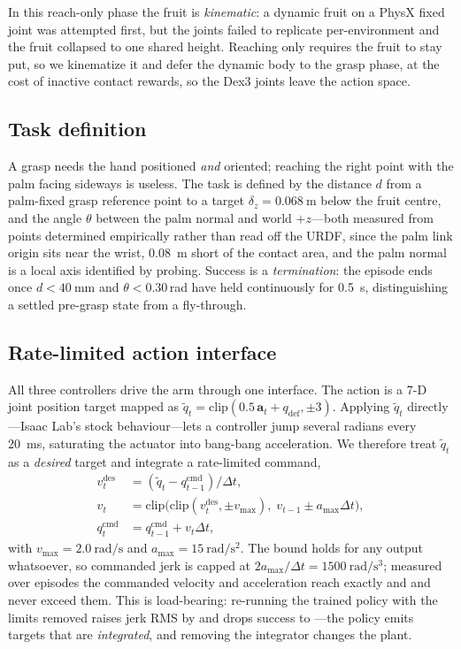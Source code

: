 \documentclass[conference]{IEEEtran}
\newcommand{\vect}[1]{\mathbf{#1}}
\begin{document}
In this reach-only phase the fruit is \emph{kinematic}: a dynamic fruit on a
PhysX fixed joint was attempted first, but the joints failed to replicate
per-environment and the fruit collapsed to one shared height. Reaching only
requires the fruit to stay put, so we kinematize it and defer the dynamic body
to the grasp phase, at the cost of inactive contact rewards, so the Dex3 joints
leave the action space.

\subsection{Task definition}

A grasp needs the hand positioned \emph{and} oriented; reaching the right point
with the palm facing sideways is useless. The task is defined by the distance
$d$ from a palm-fixed grasp reference point to a target $\delta_z =
\SI{0.068}{\metre}$ below the fruit centre, and the angle $\theta$ between the
palm normal and world $+z$---both measured from points determined empirically
rather than read off the URDF, since the palm link origin sits near the wrist,
\SI{0.08}{\metre} short of the contact area, and the palm normal is a local
axis identified by probing. Success is a \emph{termination}: the episode ends
once $d<\SI{40}{\milli\metre}$ and $\theta<0.30$\,rad have held continuously
for \SI{0.5}{\second}, distinguishing a settled pre-grasp state from a
fly-through.

\subsection{Rate-limited action interface}
\label{sec:action}

All three controllers drive the arm through one interface. The action is a 7-D
joint position target mapped as $\tilde{q}_t = \mathrm{clip}(0.5\,\vect{a}_t +
q_{\text{def}},\pm3)$. Applying $\tilde{q}_t$ directly---Isaac Lab's stock
behaviour---lets a controller jump several radians every \SI{20}{\milli\second},
saturating the actuator into bang-bang acceleration. We therefore treat
$\tilde{q}_t$ as a \emph{desired} target and integrate a rate-limited command,
\begin{align}
v^{\text{des}}_t &= (\tilde{q}_t - q^{\text{cmd}}_{t-1})/\Delta t, \nonumber\\
v_t &= \mathrm{clip}\big(\mathrm{clip}(v^{\text{des}}_t, \pm v_{\max}),\;
        v_{t-1} \pm a_{\max}\Delta t\big), \label{eq:ratelimit}\\
q^{\text{cmd}}_t &= q^{\text{cmd}}_{t-1} + v_t \Delta t, \nonumber
\end{align}
with $v_{\max}=\SI{2.0}{\radian\per\second}$ and
$a_{\max}=\SI{15}{\radian\per\second\squared}$. The bound holds for any output
whatsoever, so commanded jerk is capped at $2a_{\max}/\Delta t =
\SI{1500}{\radian\per\second\cubed}$; measured over \RESnepisodes{} episodes the
commanded velocity and acceleration reach exactly \REScmdvelOn{} and
\REScmdaccOn{} and never exceed them. This is load-bearing: re-running the
trained policy with the limits removed raises jerk RMS by \RESjerkRatio{} and
drops success to \RESablsuccess{}---the policy emits targets that are
\emph{integrated}, and removing the integrator changes the plant.
\end{document}
